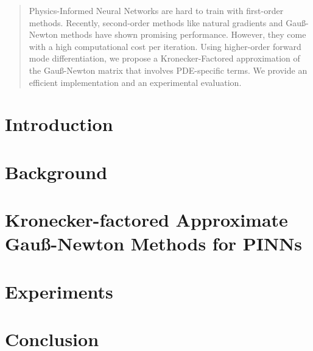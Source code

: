 \documentclass{article}
\begin{document}
\maketitle

\begin{abstract}
  Physics-Informed Neural Networks are hard to train with first-order methods. 
  Recently, second-order methods like natural gradients and Gauß-Newton methods %
  have shown promising performance. 
  However, they come with a high computational cost per iteration. 
  Using higher-order forward mode differentiation, we propose a Kronecker-Factored approximation of the Gauß-Newton matrix that involves PDE-specific terms. 
  We provide an efficient implementation and an experimental evaluation. 
\end{abstract}

\section{Introduction}


\section{Background}




\section{Kronecker-factored Approximate Gauß-Newton Methods for PINNs}\label{sec:kfac_pinns}




\section{Experiments}



\section{Conclusion}







\clearpage
\appendix


\end{document}
